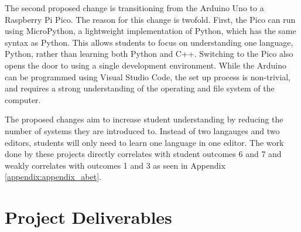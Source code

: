 The second proposed change is transitioning from the Arduino Uno
to a Raspberry Pi Pico. The reason for this change is twofold. First,
the Pico can run using MicroPython, a lightweight implementation of
Python, which has the same syntax as Python. This allows students
to focus on understanding one language, Python, rather than learning
both Python and C++. Switching to the Pico also opens the door to
using a single development environment. While the Arduino can
be programmed using Visual Studio Code, the set up process
is non-trivial, and requires a strong understanding of the
operating and file system of the computer. 

The proposed changes aim to increase student understanding
by reducing the number of systems they are introduced to. Instead
of two langauges and two editors, students will only need to
learn one language in one editor. The work done by these projects
directly correlates with student outcomes 6 and 7 and weakly
correlates with outcomes 1 and 3 as seen in Appendix 
\ref{appendix:appendix_abet}.

\section{Project Deliverables}
